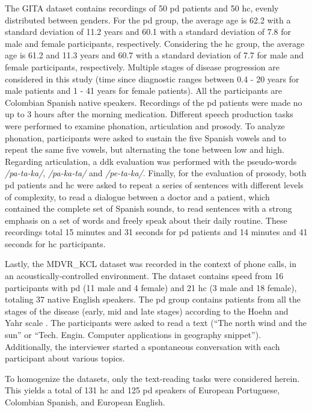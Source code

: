 The GITA dataset contains recordings of 50 \gls{pd} patients and 50 \gls{hc}, evenly distributed between genders. For the \gls{pd} group, the average age is 62.2 with a standard deviation of 11.2 years and 60.1 with a standard deviation of 7.8 for male and female participants, respectively. Considering the \gls{hc} group, the average age is 61.2 and 11.3 years and 60.7 with a standard deviation of 7.7 for male and female participants, respectively. Multiple stages of disease progression are considered in this study (time since diagnostic ranges between 0.4 - 20 years for male patients and 1 - 41 years for female patients). All the participants are Colombian Spanish native speakers. Recordings of the \gls{pd} patients were made no up to 3 hours after the morning medication. Different speech production tasks were performed to examine phonation, articulation and prosody. To analyze phonation, participants were asked to sustain the five Spanish vowels and to repeat the same five vowels, but alternating the tone between low and high. Regarding articulation, a \gls{ddk} evaluation was performed with the pseudo-words \textit{/pa-ta-ka/}, \textit{/pa-ka-ta/} and \textit{/pe-ta-ka/}. Finally, for the evaluation of prosody, both \gls{pd} patients and \gls{hc} were asked to repeat a series of sentences with different levels of complexity, to read a dialogue between a doctor and a patient, which contained the complete set of Spanish sounds, to read sentences with a strong emphasis on a set of words and freely speak about their daily routine. These recordings total 15 minutes and 31 seconds for \gls{pd} patients and 14 minutes and 41 seconds for \gls{hc} participants.

Lastly, the MDVR\_KCL dataset was recorded in the context of phone calls, in an acoustically-controlled environment. The dataset contains speed from 16 participants with \gls{pd} (11 male and 4 female) and 21 \gls{hc} (3 male and 18 female), totaling 37 native English speakers. The \gls{pd} group contains patients from all the stages of the disease (early, mid and late stages) according to the  Hoehn and Yahr scale \cite{hoehn_yahr}. The participants were asked to read a text (``The north wind and the sun'' or ``Tech. Engin. Computer applications in geography snippet''). Additionally, the interviewer started a spontaneous conversation with each participant about various topics.

To homogenize the datasets, only the text-reading tasks were considered herein. This yields a total of 131 \gls{hc} and 125 \gls{pd} speakers of European Portuguese, Colombian Spanish, and European English. 

